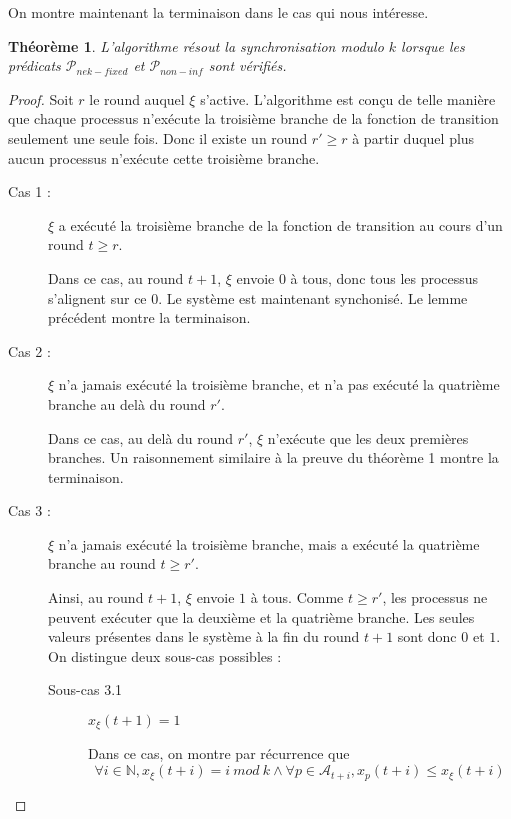 \documentclass{article}
\newtheorem{theorem}{Théorème}
\begin{document}
On montre maintenant la terminaison dans le cas qui nous intéresse.

\begin{theorem}
	L'algorithme résout la synchronisation modulo $k$ lorsque les prédicats $\mathcal{P}_{nek-fixed}$ et $\mathcal{P}_{non-inf}$ sont vérifiés.
\end{theorem}
\begin{proof}
	Soit $r$ le round auquel $\xi$ s'active.
	L'algorithme est conçu de telle manière que chaque processus n'exécute la troisième branche de la fonction de transition seulement une seule fois.
	Donc il existe un round $r' \geq r$ à partir duquel plus aucun processus n'exécute cette troisième branche.

	\begin{description}

		\item[Cas 1 : ] $\xi$ a exécuté la troisième branche de la fonction de transition au cours d'un round $t \geq r$.

			Dans ce cas, au round $t+1$, $\xi$ envoie $0$ à tous, donc tous les processus s'alignent sur ce $0$. Le système est maintenant synchonisé. Le lemme précédent montre la terminaison.

		\item[Cas 2 : ] $\xi$ n'a jamais exécuté la troisième branche, et n'a pas exécuté la quatrième branche au delà du round $r'$.

			Dans ce cas, au delà du round $r'$, $\xi$ n'exécute que les deux premières branches. Un raisonnement similaire à la preuve du théorème 1 montre la terminaison.

		\item[Cas 3 : ] $\xi$ n'a jamais exécuté la troisième branche, mais a exécuté la quatrième branche au round $t \geq r'$.

			Ainsi, au round $t+1$, $\xi$ envoie $1$ à tous. Comme $t \geq r'$, les processus ne peuvent exécuter que la deuxième et la quatrième branche.
			Les seules valeurs présentes dans le système à la fin du round $t+1$ sont donc $0$ et $1$.
			On distingue deux sous-cas possibles :

			\begin{description}

				\item[Sous-cas 3.1] $x_\xi(t+1) = 1$

					Dans ce cas, on montre par récurrence que
					$$\forall i \in \mathds{N}, x_\xi(t+i) = i~mod~k \wedge \forall p \in \mathcal{A}_{t+i}, x_p(t+i) \leq x_\xi(t+i)$$


\end{description}
\end{description}
\end{proof}
\end{document}
